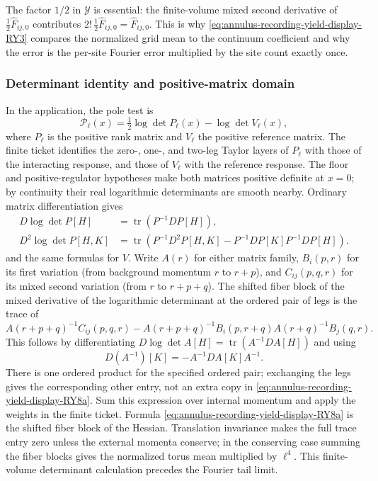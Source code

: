 The factor $1/2$ in $\mathcal Y$ is essential: the finite-volume mixed
second derivative of $\frac12\widehat F_{ij,0}$ contributes
$2!\,\frac12\widehat F_{ij,0}=\widehat F_{ij,0}$. This is why \eqref{eq:annulus-recording-yield-display-RY3}
compares the normalized grid mean to the continuum coefficient and why the
error is the per-site Fourier error multiplied by the site count exactly
once.

\subsubsection{Determinant identity and positive-matrix domain}

In the application, the pole test is
\[
 \mathcal P_\ell(x)=\tfrac12\log\det P_\ell(x)
                              -\log\det V_\ell(x),
\]
where $P_\ell$ is the positive rank matrix and $V_\ell$ the positive
reference matrix. The finite ticket identifies the zero-, one-, and
two-leg Taylor layers of $P_\ell$ with those of the interacting response,
and those of $V_\ell$ with the reference response. The floor and
positive-regulator hypotheses make both matrices positive definite at
$x=0$; by continuity their real logarithmic determinants are smooth
nearby. Ordinary matrix differentiation gives
\begin{equation}
 \begin{aligned}
 D\log\det P[H]&=\operatorname{tr}(P^{-1}DP[H]),\\
 D^2\log\det P[H,K]
 &=\operatorname{tr}\!\left(P^{-1}D^2P[H,K]
       -P^{-1}DP[K]P^{-1}DP[H]\right).
 \end{aligned}
 \label{eq:annulus-recording-yield-display-RY8}
\end{equation}
and the same formulas for $V$. Write $A(r)$ for either matrix family,
$B_i(p,r)$ for its first variation (from background momentum $r$ to
$r+p$), and $C_{ij}(p,q,r)$ for its mixed second variation (from $r$ to
$r+p+q$). The shifted fiber block of the mixed derivative of the
logarithmic determinant at the ordered pair of legs is the trace of
\begin{equation}
 A(r+p+q)^{-1}C_{ij}(p,q,r)
 -A(r+p+q)^{-1}B_i(p,r+q)A(r+q)^{-1}B_j(q,r).
 \label{eq:annulus-recording-yield-display-RY8a}
\end{equation}
This follows by differentiating
$D\log\det A[H]=\operatorname{tr}(A^{-1}DA[H])$ and using
\[D(A^{-1})[K]=-A^{-1}DA[K]A^{-1}.\] There is one ordered product for
the specified ordered pair; exchanging the legs gives the corresponding
other entry, not an extra copy in \eqref{eq:annulus-recording-yield-display-RY8a}. Sum this expression over internal
momentum and apply the weights in the finite ticket. Formula \eqref{eq:annulus-recording-yield-display-RY8a} is the
shifted fiber block of the Hessian. Translation invariance makes the full
trace entry zero unless the external momenta conserve; in the conserving
case summing the fiber blocks gives the normalized torus mean multiplied by
$\ell^4$. This finite-volume determinant
calculation precedes the Fourier tail limit.

